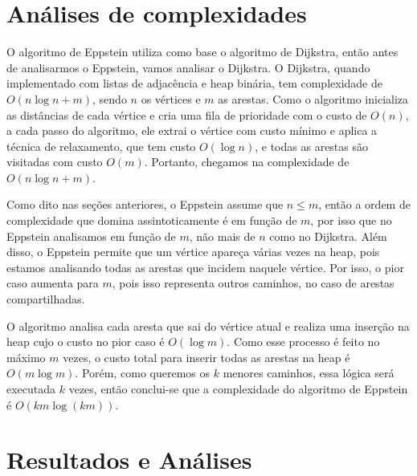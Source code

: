 \documentclass[12pt]{article}
\begin{document}
    \section{Análises de complexidades}
    O algoritmo de Eppstein utiliza como base o algoritmo de Dijkstra, então antes de analisarmos o Eppstein, vamos analisar o Dijkstra.
    O Dijkstra, quando implementado com listas de adjacência e heap binária, tem complexidade de $O(n\log n + m)$, sendo $n$ os vértices e $m$ as arestas. Como o algoritmo inicializa as distâncias de cada vértice e cria uma fila de prioridade com o custo de $O(n)$, a cada passo do algoritmo, ele extrai o vértice com custo mínimo e aplica a técnica de relaxamento, que tem custo $O(\log n)$, e todas as arestas são visitadas com custo $O(m)$. Portanto, chegamos na complexidade de $O(n\log n + m)$.
    
    Como dito nas seções anteriores, o Eppstein assume que $n \leq m$, então a ordem de complexidade que domina assintoticamente é em função de $m$, por isso que no Eppstein analisamos em função de $m$, não mais de $n$ como no Dijkstra. Além disso, o Eppstein permite que um vértice apareça várias vezes na heap, pois estamos analisando todas as arestas que incidem naquele vértice. Por isso, o pior caso aumenta para $m$, pois isso representa outros caminhos, no caso de arestas compartilhadas.
    
    O algoritmo analisa cada aresta que sai do vértice atual e realiza uma inserção na heap cujo o custo no pior caso é $O(\log m)$. Como esse processo é feito no máximo $m$ vezes, o custo total para inserir todas as arestas na heap é $O(m \log m)$. Porém, como queremos os $k$ menores caminhos, essa lógica será executada $k$ vezes, então conclui-se que a complexidade do algoritmo de Eppstein é $O(km \log (km))$.

    \section{Resultados e Análises}


    \printbibliography[title={Whole bibliography}]
\end{document}
